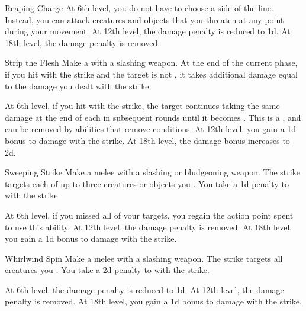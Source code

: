 {\begin{ability}{Reaping Charge}
                At 6th level, you do not have to choose a side of the line.
                Instead, you can attack creatures and objects that you threaten at any point during your movement.
                At 12th level, the damage penalty is reduced to \minus1d.
                At 18th level, the damage penalty is removed.
            \end{ability}

            \begin{ability}{Strip the Flesh}
                Make a  with a slashing weapon.
                At the end of the current phase, if you hit with the strike and the target is not , it takes additional damage equal to the damage you dealt with the strike.

                At 6th level, if you hit with the strike, the target continues taking the same damage at the end of each  in subsequent rounds until it becomes .
                This is a , and can be removed by abilities that remove conditions.
                At 12th level, you gain a \plus1d bonus to damage with the strike.
                At 18th level, the damage bonus increases to \plus2d.
            \end{ability}

            \begin{ability}{Sweeping Strike}
                Make a melee  with a slashing or bludgeoning weapon.
                The strike targets each of up to three creatures or objects you .
                You take a \minus1d penalty to  with the strike.

                At 6th level, if you missed all of your targets, you regain the action point spent to use this ability.
                At 12th level, the damage penalty is removed.
                At 18th level, you gain a \plus1d bonus to damage with the strike.
            \end{ability}

            \begin{ability}{Whirlwind Spin}
                Make a melee  with a slashing weapon.
                The strike targets all creatures you .
                You take a \minus2d penalty to  with the strike.

                At 6th level, the damage penalty is reduced to \minus1d.
                At 12th level, the damage penalty is removed.
                At 18th level, you gain a \plus1d bonus to damage with the strike.
            \end{ability}
        }

